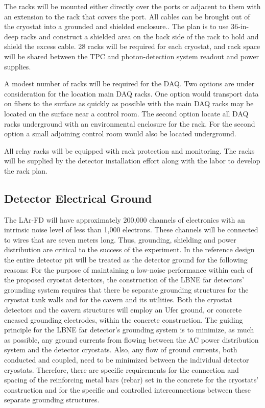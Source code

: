 The racks will be mounted either directly over the ports or adjacent to them with an extension to the rack that covers the port. All cables can be brought out of the cryostat into a grounded and shielded 
enclosure.. The plan is to use 36-in-deep racks and construct a shielded area on the back side of the rack to hold and shield the excess cable. 28 racks will be required for each cryostat, and rack space will be shared between the TPC and photon-detection system readout and power supplies. 

A modest number of racks will be required for the DAQ. Two options are under consideration for the location main DAQ racks. One option would transport data on fibers to the surface as quickly as possible 
with the main DAQ racks may be located on the surface near a control room. The second option locate all DAQ racks underground with an environmental enclosure for the rack. For the second option a small adjoining control room would also be located underground.

All relay racks will be equipped with rack protection and monitoring. The racks will be supplied by the 
detector installation effort along with the labor to develop the rack plan.

\subsection{Detector Electrical Ground} 
\label{fd:install:integ:elecgnd}

The LAr-FD will have approximately 200,000 channels of electronics with an intrinsic noise level of less than 1,000 electrons. These channels will be connected to wires that are seven meters long. Thus, 
grounding, shielding and power distribution are critical to the success of the experiment. In the reference design the entire detector pit will be treated as the detector ground for the following reasons: 
For the purpose of maintaining a low-noise performance within each of the proposed cryostat detectors, the construction of the LBNE far detectors' grounding system requires that there be separate grounding 
structures for the cryostat tank walls and for the cavern and its utilities. Both the cryostat detectors and the cavern structures will employ an Ufer ground, or concrete encased grounding electrodes, within the concrete construction. The guiding principle for the LBNE far detector's grounding system is to minimize, 
as much as possible, any ground currents from flowing between the AC power distribution system and the detector cryostats. Also, any flow of ground currents, both conducted and coupled, need to be 
minimized between the individual detector cryostats. Therefore, there are specific requirements for the connection and spacing of the reinforcing metal bars (rebar) set in the concrete for the cryostats' 
construction and for the specific and controlled interconnections between these separate grounding structures.

